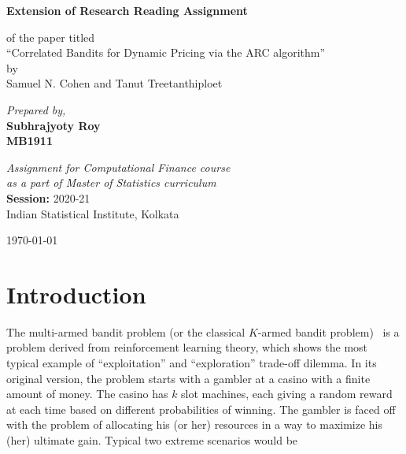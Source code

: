 \documentclass[11pt]{article}
\begin{document}
\begin{titlepage}
    \begin{center}
        \vspace*{5cm}
 
        \Huge{\textbf{Extension of Research Reading Assignment}}
 
        \vspace{0.5cm}
        \large{of the paper titled}\\
        \large{``Correlated Bandits for Dynamic Pricing via the ARC algorithm''}\\
        \large{by}\\
        \large{Samuel N. Cohen and Tanut Treetanthiploet}
             
        \vspace{1.5cm}
 
        \large{\textit{Prepared by,}}\\
        \large{\textbf{Subhrajyoty Roy}}\\
        \large{\textbf{MB1911}}
 
        \vspace{2cm}
             
        \textit{Assignment for Computational Finance course\\
        as a part of Master of Statistics curriculum}\\
        \vspace{0.5cm}
        \textbf{Session: } 2020-21\\
        Indian Statistical Institute, Kolkata

        \vfill
        
        \begin{flushright}
            \normalsize{\today}            
        \end{flushright}
    \end{center}
\end{titlepage}


\section{Introduction}

The multi-armed bandit problem (or the classical $K$-armed bandit problem)~\cite{katehakis1987multi} is a problem derived from reinforcement learning theory, which shows the most typical example of ``exploitation'' and ``exploration'' trade-off dilemma. In its original version, the problem starts with a gambler at a casino with a finite amount of money. The casino has $k$ slot machines, each giving a random reward at each time based on different probabilities of winning. The gambler is faced off with the problem of allocating his (or her) resources in a way to maximize his (her) ultimate gain. Typical two extreme scenarios would be 
\end{document}
